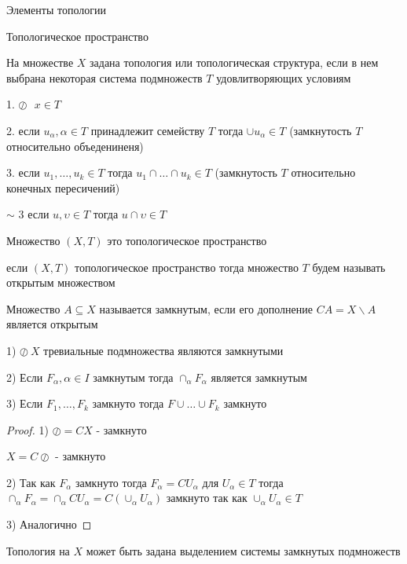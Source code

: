 \begin{title}
  Элементы топологии
\end{title}

\begin{title}[\Large]
  Топологическое пространство
\end{title}

\begin{define}
  На множестве $X$ задана топология или топологическая структура, если в нем
  выбрана некоторая система подмножеств $T$ удовлитворяющих условиям

  1. $\oslash ~~~ x \in T$

  2. если $u_{\alpha}, \alpha \in T$ принадлежит семейству $T$ тогда
  $\cup u_{\alpha} \in T$ (замкнутость $T$ относительно объедениненя)

  3. если $u_1, \ldots, u_k \in T$ тогда $u_1 \cap \ldots \cap u_k \in T$
  (замкнутость $T$ относительно конечных пересичений)

  $\sim$ 3 если $u, \upsilon \in T$ тогда $u \cap \upsilon \in T$
\end{define}

\begin{define}
  Множество $(X, T)$ это топологическое пространство
\end{define}

если $(X, T)$ топологическое пространство тогда множество $T$ будем называть
открытым множеством

\begin{define}
  Множество $A \subseteq X$ называется замкнутым, если его дополнение
  $CA = X \backslash A$ является открытым
\end{define}

\begin{block}[Свойства]
  1) $\oslash ~ X$ тревиальные подмножества являются замкнутыми

  2) Если $F_{\alpha}, \alpha \in I$ замкнутым тогда $\cap_{\alpha}F_{\alpha}$
  является замкнутым

  3) Если $F_1, \ldots, F_k$ замкнуто тогда $F \cup \ldots \cup F_k$ замкнуто
\end{block}

\begin{proof}
  1) $\oslash = CX$ - замкнуто

  $X = C \oslash$ - замкнуто

  2) Так как $F_{\alpha}$ замкнуто тогда $F_{\alpha} = CU_{\alpha}$ для
  $U_{\alpha} \in T$ тогда $\cap_{\alpha}F_{\alpha} = \cap_{\alpha}CU_{\alpha}
  = C(\cup_{\alpha}U_{\alpha})$ замкнуто так как $\cup_{\alpha} U_{\alpha}
  \in T$

  3) Аналогично
\end{proof}

\begin{block}[Замечание]
  Топология на $X$ может быть задана выделением системы замкнутых подмножеств
\end{block}
